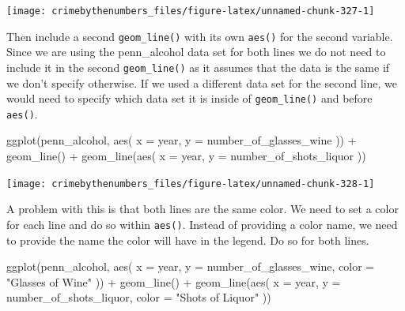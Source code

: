 \documentclass[
]{krantz}
\makeatletter
\newenvironment{Shaded}{\begin{snugshade}}{\end{snugshade}}
\newcommand{\AttributeTok}[1]{\textcolor[rgb]{0.61,0.61,0.61}{#1}}
\newcommand{\FunctionTok}[1]{\textcolor[rgb]{0,0,0}{#1}}
\newcommand{\NormalTok}[1]{#1}
\newcommand{\SpecialCharTok}[1]{\textcolor[rgb]{0,0,0}{#1}}
\newcommand{\StringTok}[1]{\textcolor[rgb]{0.5,0.5,0.5}{#1}}
\newenvironment{kframe}{%
\medskip{}
\setlength{\fboxsep}{.8em}
 \def\at@end@of@kframe{}%
 \ifinner\ifhmode%
  \def\at@end@of@kframe{\end{minipage}}%
  \begin{minipage}{\columnwidth}%
 \fi\fi%
 \def\FrameCommand##1{\hskip\@totalleftmargin \hskip-\fboxsep
 \colorbox{shadecolor}{##1}\hskip-\fboxsep
     \hskip-\linewidth \hskip-\@totalleftmargin \hskip\columnwidth}%
 \MakeFramed {\advance\hsize-\width
   \@totalleftmargin\z@ \linewidth\hsize
   \@setminipage}}%
 {\par\unskip\endMakeFramed%
 \at@end@of@kframe}
\renewenvironment{Shaded}{\begin{kframe}}{\end{kframe}}
\makeatother
\begin{document}
\begin{center}\texttt{[image: crimebythenumbers\_files/figure-latex/unnamed-chunk-327-1]} \end{center}

Then include a second \texttt{geom\_line()} with its own
\texttt{aes()} for the second variable. Since we are using
the penn\_alcohol data set for both lines we do not need to
include it in the second \texttt{geom\_line()} as it assumes
that the data is the same if we don't specify otherwise. If
we used a different data set for the second line, we would
need to specify which data set it is inside of
\texttt{geom\_line()} and before \texttt{aes()}.

\begin{Shaded}
\begin{Highlighting}[]
\FunctionTok{ggplot}\NormalTok{(penn\_alcohol, }\FunctionTok{aes}\NormalTok{(}
  \AttributeTok{x =}\NormalTok{ year,}
  \AttributeTok{y =}\NormalTok{ number\_of\_glasses\_wine}
\NormalTok{)) }\SpecialCharTok{+}
  \FunctionTok{geom\_line}\NormalTok{() }\SpecialCharTok{+}
  \FunctionTok{geom\_line}\NormalTok{(}\FunctionTok{aes}\NormalTok{(}
    \AttributeTok{x =}\NormalTok{ year,}
    \AttributeTok{y =}\NormalTok{ number\_of\_shots\_liquor}
\NormalTok{  ))}
\end{Highlighting}
\end{Shaded}

\begin{center}\texttt{[image: crimebythenumbers\_files/figure-latex/unnamed-chunk-328-1]} \end{center}

A problem with this is that both lines are the same color.
We need to set a color for each line and do so within
\texttt{aes()}. Instead of providing a color name, we need
to provide the name the color will have in the legend. Do so
for both lines.

\begin{Shaded}
\begin{Highlighting}[]
\FunctionTok{ggplot}\NormalTok{(penn\_alcohol, }\FunctionTok{aes}\NormalTok{(}
  \AttributeTok{x =}\NormalTok{ year,}
  \AttributeTok{y =}\NormalTok{ number\_of\_glasses\_wine,}
  \AttributeTok{color =} \StringTok{"Glasses of Wine"}
\NormalTok{)) }\SpecialCharTok{+}
  \FunctionTok{geom\_line}\NormalTok{() }\SpecialCharTok{+}
  \FunctionTok{geom\_line}\NormalTok{(}\FunctionTok{aes}\NormalTok{(}
    \AttributeTok{x =}\NormalTok{ year,}
    \AttributeTok{y =}\NormalTok{ number\_of\_shots\_liquor,}
    \AttributeTok{color =} \StringTok{"Shots of Liquor"}
\NormalTok{  ))}
\end{Highlighting}
\end{Shaded}
\end{document}

